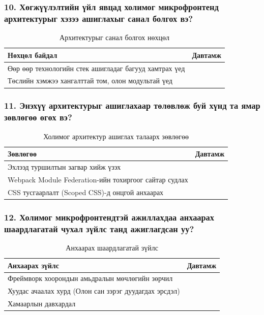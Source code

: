 \subsubsection{10. Хөгжүүлэлтийн үйл явцад холимог микрофронтенд архитектурыг хэзээ ашиглахыг санал болгох вэ?}
\begin{table}[h!]
\centering
\renewcommand{\arraystretch}{0.7}
\begin{tabular}{lc}
\toprule
\textbf{Нөхцөл байдал} & \textbf{Давтамж} \\ 
\midrule
Өөр өөр технологийн стек ашигладаг багууд хамтрах үед & \\ 
Төслийн хэмжээ хангалттай том, олон модультай үед & \\ 
\bottomrule
\end{tabular}
\caption{Архитектурыг санал болгох нөхцөл}
\label{tab:recommendation_conditions}
\end{table}

\subsubsection{11. Энэхүү архитектурыг ашиглахаар төлөвлөж буй хүнд та ямар зөвлөгөө өгөх вэ?}
\begin{table}[h!]
\centering
\renewcommand{\arraystretch}{0.7}
\begin{tabular}{lc}
\toprule
\textbf{Зөвлөгөө} & \textbf{Давтамж} \\ 
\midrule
Эхлээд туршилтын загвар хийж үзэх & \\ 
Webpack Module Federation-ийн тохиргоог сайтар судлах & \\ 
CSS тусгаарлалт (Scoped CSS)-д онцгой анхаарах & \\ 
\bottomrule
\end{tabular}
\caption{Холимог архитектур ашиглах талаарх зөвлөгөө}
\label{tab:mixed_architecture_advice}
\end{table}

\subsubsection{12. Холимог микрофронтендтэй ажиллахдаа анхаарах шаардлагатай чухал зүйлс танд ажиглагдсан уу?}
\begin{table}[h!]
\centering
\renewcommand{\arraystretch}{0.7}
\begin{tabular}{lc}
\toprule
\textbf{Анхаарах зүйлс} & \textbf{Давтамж} \\ 
\midrule
Фреймворк хоорондын амьдралын мөчлөгийн зөрчил & \\ 
Хуудас ачаалах хурд (Олон сан зэрэг дуудагдах эрсдэл) & \\ 
Хамаарлын давхардал & \\ 
\bottomrule
\end{tabular}
\caption{Анхаарах шаардлагатай зүйлс}
\label{tab:considerations}
\end{table}

